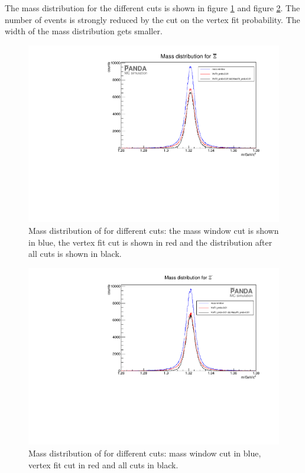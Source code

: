 		The mass distribution for the different cuts is shown in figure \ref{fig:XiPlus_massdiffcuts} and figure \ref{fig:XiMinus_massdiffcuts}.
		The number of events is strongly reduced by the cut on the vertex fit probability. 
		The width of the mass distribution gets smaller. 
		
		\begin{figure}
			\centering
				\includegraphics[width=1.1\textwidth]{./plots/Xi/XiPlus_m_diffcuts.pdf}
			\caption{\propose Mass distribution of \anticascade for different cuts: the mass window cut is shown in blue, the vertex fit cut is shown in red 
					and the distribution after all cuts is shown in black.}
			\label{fig:XiPlus_massdiffcuts}
		\end{figure}
		
		\begin{figure}
			\centering		
				\includegraphics[width=1.1\textwidth]{./plots/Xi/XiMinus_m_diffcuts.pdf}
			\caption{\propose Mass distribution of \cascade for different cuts: mass window cut in blue, vertex fit cut in red and all cuts in black.}
			\label{fig:XiMinus_massdiffcuts}
		\end{figure}
		
